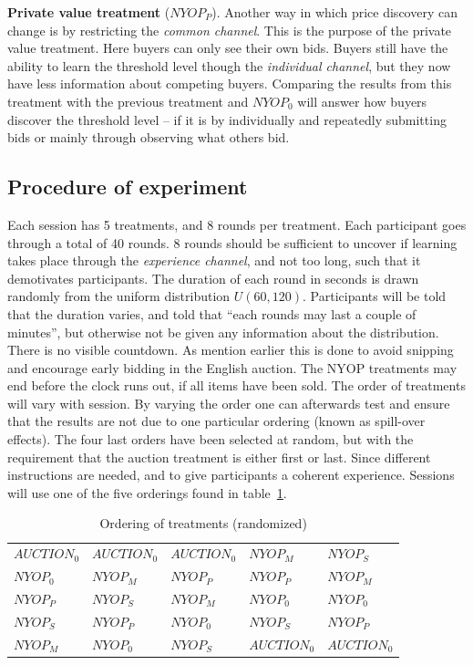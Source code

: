 \documentclass[a4paper,12pt]{article}
\begin{document}
	{\bf Private value treatment} ($NYOP_P$).
	Another way in which price discovery can change is by restricting the \emph{common channel}. This is the purpose of the private value treatment. Here buyers can only see their own bids. Buyers still have the ability to learn the threshold level though the \emph{individual channel}, but they now have less information about competing buyers. Comparing the results from this treatment with the previous treatment and $NYOP_0$ will answer how buyers discover the threshold level -- if it is by individually and repeatedly submitting bids or mainly through observing what others bid. 
	
	\subsection{Procedure of experiment}
	
	Each session has 5 treatments, and 8 rounds per treatment. Each participant goes through a total of 40 rounds. 8 rounds should be sufficient to uncover if learning takes place through the \emph{experience channel}, and not too long, such that it demotivates participants. The duration of each round in seconds is drawn randomly from the uniform distribution $U(60, 120)$. Participants will be told that the duration varies, and told that ``each rounds may last a couple of minutes'', but otherwise not be given any information about the distribution. There is no visible countdown. As mention earlier this is done to avoid snipping and encourage early bidding in the English auction. The NYOP treatments may end before the clock runs out, if all items have been sold. The order of treatments will vary with session. By varying the order one can afterwards test and ensure that the results are not due to one particular ordering (known as spill-over effects). The four last orders have been selected at random, but with the requirement that the auction treatment is either first or last. Since different instructions are needed, and to give participants a coherent experience. Sessions will use one of the five orderings found in table~\ref{tab:order}.

	\begin{table}[ht]
		\caption{Ordering of treatments (randomized)}
		\begin{tabular}{l | l | l | l | l}
			$AUCTION_0$	& $AUCTION_0$ 	& $AUCTION_0$ 	& $NYOP_M$ 		& $NYOP_S$ 	\\
			$NYOP_0$ 	& $NYOP_M$		& $NYOP_P$		& $NYOP_P$		& $NYOP_M$	\\
			$NYOP_P$ 	& $NYOP_S$		& $NYOP_M$		& $NYOP_0$		& $NYOP_0$	\\
			$NYOP_S$	& $NYOP_P$		& $NYOP_0$		& $NYOP_S$		& $NYOP_P$	\\
			$NYOP_M$	& $NYOP_0$		& $NYOP_S$		& $AUCTION_0$	& $AUCTION_0$	
		\end{tabular}
		\label{tab:order}
	\end{table}
	
\end{document}
